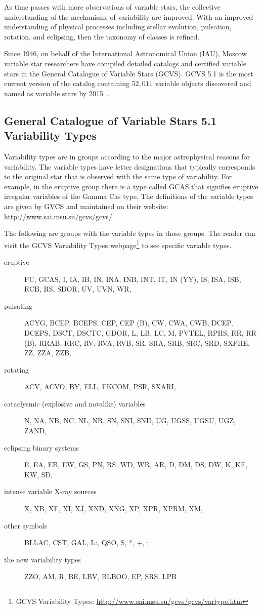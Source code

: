 As time passes with more observations of variable stars, the collective understanding of the mechanisms of variability are improved.
With an improved understanding of physical processes including stellar evolution, pulsation, rotation, and eclipsing, then the taxonomy of classes is refined.

Since 1946, on behalf of the International Astronomical Union (IAU), Moscow variable star researchers have compiled detailed catalogs and certified 
variable stars in the General Catalogue of Variable Stars (GCVS). 
GCVS 5.1 is the most current version of the catalog containing $52,011$ variable objects discovered and named as variable stars by 2015~\cite{samus_2017}.

\subsection{General Catalogue of Variable Stars 5.1 Variability Types}
Variability types are in groups according to the major astrophysical reasons for variability.
The variable types have letter designations that typically corresponds to the original star that is observed with the same type of variability.
For example, in the eruptive group there is a type called GCAS that signifies eruptive irregular variables of the Gamma Cas type.
The definitions of the variable types are given by GVCS and maintained on their
website: \url{http://www.sai.msu.su/gcvs/gcvs/}

The following are groups with the variable types in those groups.
The reader can visit the GCVS Variability Types webpage\footnote{GCVS Variability Types: \url{http://www.sai.msu.su/gcvs/gcvs/vartype.htm}} to 
see specific variable types. 
\begin{description}
    \item [eruptive] FU, GCAS, I, IA, IB, IN, INA, INB, INT, IT, IN (YY), IS, ISA, ISB, RCB, RS, SDOR, UV, UVN, WR,
    \item [pulsating] ACYG, BCEP, BCEPS, CEP, CEP (B), CW, CWA, CWB, DCEP, DCEPS, DSCT, DSCTC, GDOR, L, LB, LC, M, PVTEL, RPHS, RR, RR (B), RRAB,
           RRC, RV, RVA, RVB, SR, SRA, SRB, SRC, SRD, SXPHE, ZZ, ZZA, ZZB,
    \item [rotating] ACV, ACVO, BY, ELL, FKCOM, PSR, SXARI,
    \item [cataclysmic (explosive and novalike) variables] N, NA, NB, NC, NL, NR, SN, SNI, SNII, UG, UGSS, UGSU, UGZ, ZAND,
    \item [eclipsing binary systems] E, EA, EB, EW, GS, PN, RS, WD, WR, AR, D, DM, DS, DW, K, KE, KW, SD,
    \item [intense variable X-ray sources] X, XB, XF, XI, XJ, XND, XNG, XP, XPR, XPRM, XM,
    \item [other symbols] BLLAC, CST, GAL, L:, QSO, S, *, +, $\colon$
    \item [the new variability types] ZZO, AM, R, BE, LBV, BLBOO, EP, SRS, LPB
\end{description}

